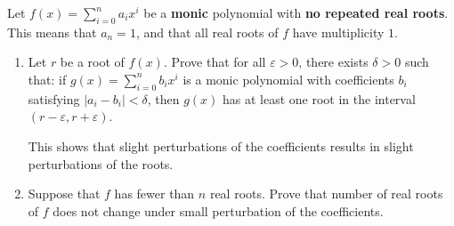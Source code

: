 \documentclass{article}
\theoremstyle{plain} %
\numberwithin{thm}{section} %
\theoremstyle{definition}
\begin{document}
    Let $f(x)=\sum_{i=0}^n a_ix^i$ be a \textbf{monic} polynomial with \textbf{no repeated real roots}. This means that $a_n=1$, and that all real roots of $f$ have multiplicity $1$.
    \begin{enumerate}[label=(\alph*)]
        \item 
        
        Let $r$ be a root of $f(x)$. Prove that for all $\varepsilon>0$, there exists $\delta>0$ such that: if $g(x)=\sum_{i=0}^n b_ix^i$ is a monic polynomial with coefficients $b_i$ satisfying $|a_i-b_i|<\delta$, then $g(x)$ has at least one root in the interval $(r-\varepsilon,r+\varepsilon)$.

        This shows that slight perturbations of the coefficients results in slight perturbations of the roots.
        
        \item Suppose that $f$ has fewer than $n$ real roots. Prove that number of real roots of $f$ does not change under small perturbation of the coefficients.
    \end{enumerate}
\end{document}
